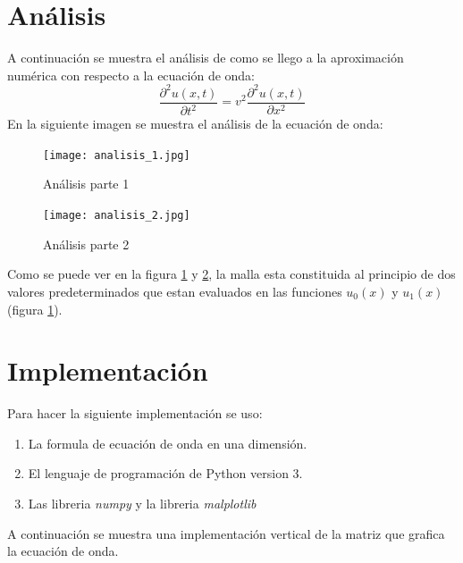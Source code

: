 \documentclass[a4paper,12pt]{article}
\newcommand{\eq}[1]{$#1$}
\begin{document}
    \section{Análisis}
    
    A continuación se muestra el análisis de como se llego a la aproximación numérica
    con respecto a la ecuación de onda:
    \begin{equation}
        \frac{\partial^2 u(x,t)}{\partial t^2} = v^2\frac{\partial^2 u(x,t)}{\partial x^2}
    \end{equation}
    \clearpage
    En la siguiente imagen se muestra el análisis de la ecuación de onda:
    \begin{figure}[h]
        \centering
        \texttt{[image: analisis\_1.jpg]}
        \caption{Análisis parte 1}
        \label{fig:ana1}
    \end{figure}
    \enlargethispage{\baselineskip}
    \clearpage
    \begin{figure}[t]
        \centering
        \texttt{[image: analisis\_2.jpg]}
        \label{fig:ana2}
        \caption{Análisis parte 2}
    \end{figure}

    Como se puede ver en la figura \ref{fig:ana1} y \ref{fig:ana2},
    la malla esta constituida al principio de dos valores predeterminados
    que estan evaluados en las funciones \eq{u_0(x)} y \eq{u_1(x)}(figura \ref{fig:ana1}).

    \section{Implementación}
    Para hacer la siguiente implementación se uso:
    \begin{enumerate}
        \item La formula de ecuación de onda en una dimensión.
        \item El lenguaje de programación de Python version 3.
        \item Las libreria \emph{numpy} y la libreria \emph{malplotlib}
    \end{enumerate}

    A continuación se muestra una implementación vertical 
    de la matriz que grafica la ecuación de onda.
    
    
\end{document}
